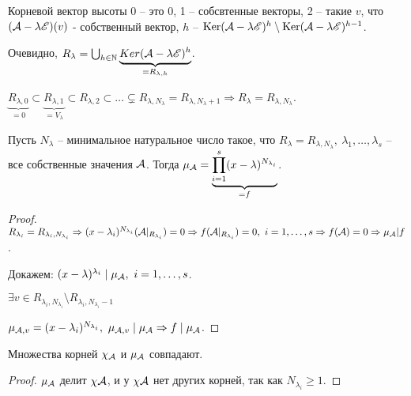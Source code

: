 \documentclass[main]{subfiles}
\begin{document}
Корневой вектор высоты 0 -- это 0, 1 -- собсвтенные векторы, 2 -- такие $v$, что $(\mathcal{A} - \lambda \mathscr{E})(v)$ - собственный вектор,
$h$ -- $\operatorname{Ker}(\mathcal{A} - \lambda \mathscr{E})^h \setminus \operatorname{Ker}(\mathcal{A} - \lambda \mathscr{E})^{h-1}$.

Очевидно, $R_{\lambda} = \bigcup_{h \in \mathbb{N}} \underbrace{Ker(\mathcal{A} - \lambda \mathscr{E})^h}_{= R_{\lambda, h}}$.

$\underbrace{R_{\lambda, 0}}_{=0} \subset \underbrace{R_{\lambda, 1}}_{= V_{\lambda}} \subset R_{\lambda, 2} \subset \ldots \subsetneq  R_{\lambda, N_{\lambda}} = R_{\lambda, N_{\lambda} + 1} \Rightarrow
  R_{\lambda} = R_{\lambda, N_{\lambda}}$.

\begin{proposition}
  Пусть $N_{\lambda}$ -- минимальное натуральное число такое, что $R_{\lambda} = R_{\lambda, N_{\lambda}}, \ \lambda_1, \ldots, \lambda_s$ -- все собственные значения $\mathcal{A}$.
  Тогда ${\mu}_{\mathcal{A}} = \underbrace{\prod_{i = 1}^s(x-\lambda)^{N_{\lambda_i}}}_{=f}$.
\end{proposition}

\begin{proof}
  $R_{\lambda_i} = R_{\lambda_i, N_{\lambda_i}} \Rightarrow (x - \lambda_i)^{N_{\lambda_i}}(\mathcal{A}|_{R_{\lambda_i}}) = 0 \Rightarrow
    f(\mathcal{A}|_{R_{\lambda_i}}) = 0, \ i = 1, \ldots, s \Rightarrow f(\mathcal{A}) = 0 \Rightarrow \mu_{\mathcal{A}} | f$.

  Докажем: $(x - \lambda)^{\lambda_i} \mid \mu_{\mathcal{A}}, \ i = 1, \ldots, s$.

  $\exists v \in R_{\lambda_i, N_{\lambda_i}}\setminus R_{\lambda_i, N_{\lambda_i} - 1}$

  $\mu_{\mathcal{A}, v} = (x - \lambda_i)^{N_{\lambda_i}}, \ \mu_{\mathcal{A}, v} \mid \mu_{\mathcal{A}} \Rightarrow f \mid \mu_{\mathcal{A}}$.
\end{proof}

\begin{corollary}
  Множества корней $\chi_{\mathcal{A}}$ и $\mu_{\mathcal{A}}$ совпадают.
\end{corollary}

\begin{proof}
  $\mu_{\mathcal{A}}$ делит $\chi{\mathcal{A}}$, и у $\chi{\mathcal{A}}$ нет других корней, так как $N_{\lambda_i} \geq  1$.
\end{proof}
\end{document}
